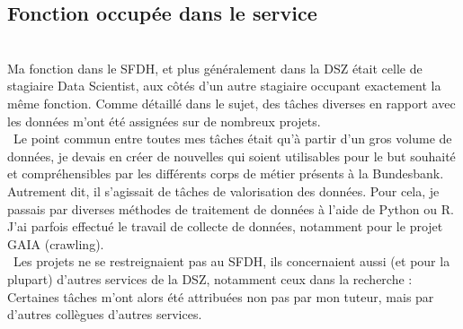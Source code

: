 \pagebreak

\subsection{Fonction occupée dans le service}
~\\
Ma fonction dans le SFDH, et plus généralement dans la DSZ était celle de stagiaire Data Scientist, aux côtés d'un autre stagiaire occupant exactement la même fonction.
Comme détaillé dans le sujet, des tâches diverses en rapport avec les données m'ont été assignées sur de nombreux projets.
\\

~Le point commun entre toutes mes tâches était qu'à partir d'un gros volume de données, je devais en créer de nouvelles qui soient utilisables pour le but souhaité et compréhensibles par les différents corps de métier présents à la Bundesbank.
Autrement dit, il s'agissait de tâches de valorisation des données. Pour cela, je passais par diverses méthodes de traitement de données à l'aide de Python ou R.
J'ai parfois effectué le travail de collecte de données, notamment pour le projet GAIA (crawling).
\\

~Les projets ne se restreignaient pas au SFDH, ils concernaient aussi (et pour la plupart) d'autres services de la DSZ, notamment ceux dans la recherche :
Certaines tâches m'ont alors été attribuées non pas par mon tuteur, mais par d'autres collègues d'autres services.
